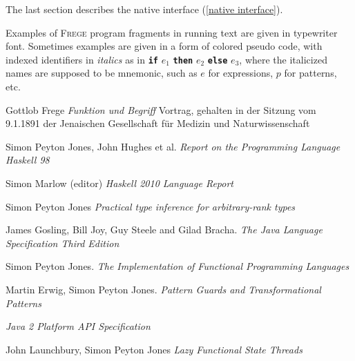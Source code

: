 \documentclass[lletterpaper,12pt]{report}
\newcommand{\frege}[0]{\textsc{Frege}}
\newcommand{\term}[1]{\textbf{\texttt{\textcolor{trmred}{#1}}}}
\begin{document}
The last section describes  the native interface
(\autoref{native interface}).

Examples of \frege{} program fragments in running text are given in
typewriter font. Sometimes examples are given in a form of
colored pseudo code,
with indexed identifiers in \emph{italics} as in \term{if} $e_1$
\term{then} $e_2$ \term{else} $e_3$, where the  italicized names are
supposed to be mnemonic, such as $e$ for expressions, $p$ for patterns,
etc.






%


\appendix


\begin{thebibliography}{99}

 Gottlob Frege \emph{Funktion und Begriff} 
\small{Vortrag, gehalten in der Sitzung vom 9.1.1891 der Jenaischen Gesellschaft für Medizin und Naturwissenschaft}

 Simon Peyton Jones,
John Hughes et al. \emph{Report on the Programming Language
Haskell 98}

 Simon Marlow (editor) \emph{Haskell 2010 Language Report}

 Simon Peyton Jones \emph{Practical type
inference for arbitrary-rank types}

 James Gosling, Bill Joy, Guy Steele and
Gilad Bracha. \emph{The Java Language Specification Third
Edition}

 Simon Peyton Jones. \emph{The Implementation of
Functional Programming Languages}

 Martin Erwig, Simon Peyton Jones. \emph{Pattern
Guards and Transformational Patterns}

 \emph{Java 2 Platform API Specification}

 John Launchbury, Simon Peyton Jones \emph{Lazy Functional State Threads}

\end{thebibliography}


\printindex

\end{document}
